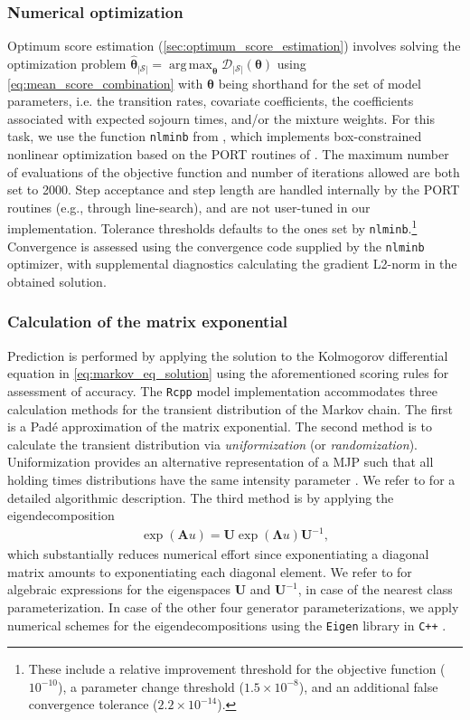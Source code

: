 \documentclass{article}
\DeclareMathOperator*{\argmax}{arg\,max}
\begin{document}
\subsubsection{Numerical optimization} 
Optimum score estimation (\cref{sec:optimum_score_estimation}) involves solving the optimization problem $\widehat{\bm{\theta}}_{|\mathcal{S}|} = \argmax_{\bm{\theta}}\mathcal{D}_{|\mathcal{S}|}(\bm{\theta})$ using \cref{eq:mean_score_combination} with $\bm{\theta}$ being shorthand for the set of model parameters, i.e. the transition rates, covariate coefficients, the coefficients associated with expected sojourn times, and/or the mixture weights.
For this task, we use the function \texttt{nlminb} from \citet{R_stats}, which implements box-constrained nonlinear optimization based on the PORT routines of \citet{Gay1990}. The maximum number of evaluations of the objective function and number of iterations allowed are both set to 2000.
Step acceptance and step length are handled internally by the PORT routines (e.g., through line-search), and are not user-tuned in our implementation.
Tolerance thresholds defaults to the ones set by \texttt{nlminb}.\footnote{These include a relative improvement threshold for the objective function ($10^{-10}$), a parameter change threshold ($1.5 \times 10^{-8}$), and an additional false convergence tolerance ($2.2\times 10^{-14}$).}
Convergence is assessed using the convergence code supplied by the \texttt{nlminb} optimizer, with supplemental diagnostics calculating the gradient L2-norm in the obtained solution.




\subsubsection{Calculation of the matrix exponential} Prediction is performed by applying the solution to the Kolmogorov differential equation in \cref{eq:markov_eq_solution} using the aforementioned scoring rules for assessment of accuracy.
The \texttt{Rcpp} model implementation accommodates three calculation methods for the transient distribution of the Markov chain. The first is a Padé approximation of the matrix exponential. The second method is to calculate the transient distribution via \textit{uniformization} (or \textit{randomization}). Uniformization provides an alternative representation of a MJP such that all holding times distributions have the same intensity parameter \citep[Section 1.3.4]{bladt_nielsen}. We refer to \citet{sherlock2021a} for a detailed algorithmic description. The third method is by applying the eigendecomposition
\begin{align*}
    \exp{\left( \bm{A}u \right) } = \bm{U}  \exp{\left( \bm{\Lambda}u \right) } \bm{U}^{-1}, 
\end{align*}
which substantially reduces numerical effort since exponentiating a diagonal matrix amounts to exponentiating each diagonal element.
We refer to \citet{bisgaard2024A} for algebraic expressions for the eigenspaces $\bm{U}$ and $\bm{U}^{-1}$, in case of the nearest class parameterization. In case of the other four generator parameterizations, we apply numerical schemes for the eigendecompositions using the \texttt{Eigen} library in \texttt{C++} \citep{eigenweb}.
\end{document}
